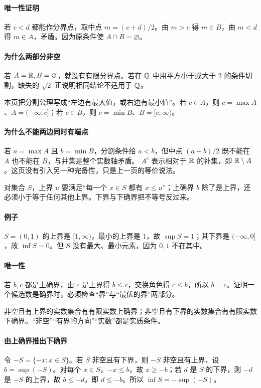 \paragraph{唯一性证明}若 $c<d$ 都能作分界点，取中点 $m=(c+d)/2$。由 $m>c$ 得 $m\in B$，由 $m<d$ 得 $m\in A$，矛盾。因为原条件使 $A\cap B=\varnothing$。
\paragraph{为什么两部分非空}若 $A=\mathbb{R},B=\varnothing$，就没有有限分界点。若在 $\mathbb{Q}$ 中用平方小于或大于 $2$ 的条件切割，缺失的 $\sqrt2$ 正说明相同结论不适用于 $\mathbb{Q}$。

本页把分割公理写成“左边有最大值，或右边有最小值”。若 $c\in A$，则 $c=\max A$、$A=(-\infty,c]$；若 $c\in B$，则 $c=\min B$、$B=[c,\infty)$。
\paragraph{为什么不能两边同时有端点}若 $a=\max A$ 且 $b=\min B$，分割条件给 $a<b$，但中点 $(a+b)/2$ 既不能在 $A$ 也不能在 $B$，与并集是整个实数轴矛盾。
$A^c$ 表示相对于 $\mathbb{R}$ 的补集，即 $\mathbb{R}\setminus A$。这页没有引入另一种完备性，只是上一页的等价说法。

对集合 $S$，上界 $u$ 要满足“每一个 $x\in S$ 都有 $x\le u$”；上确界 $b$ 除了是上界，还必须小于等于任何其他上界。下界与下确界把不等号反过来。
\paragraph{例子}$S=(0,1)$ 的上界是 $[1,\infty)$，最小的上界是 $1$，故 $\sup S=1$；其下界是 $(-\infty,0]$，故 $\inf S=0$。但 $S$ 没有最大、最小元素，因为 $0,1$ 不在其中。
\paragraph{唯一性}若 $b,c$ 都是上确界，由 $c$ 是上界得 $b\le c$，交换角色得 $c\le b$，所以 $b=c$。证明一个候选数是确界时，必须检查“界”与“最优的界”两部分。

非空且有上界的实数集合有有限实数上确界；非空且有下界的实数集合有有限实数下确界。“非空”“有界的方向”“实数”都是实质条件。
\paragraph{由上确界推出下确界}令 $-S=\{-x:x\in S\}$。若 $S$ 非空且有下界，则 $-S$ 非空且有上界，设 $b=\sup(-S)$。对每个 $x\in S$，$-x\le b$，故 $x\ge-b$；若 $d$ 是 $S$ 的下界，则 $-d$ 是 $-S$ 的上界，故 $b\le-d$，即 $d\le-b$。所以 $\inf S=-\sup(-S)$。
